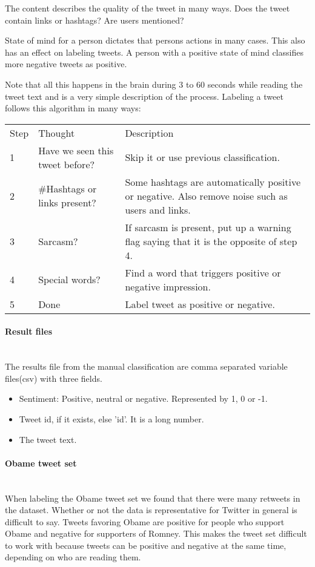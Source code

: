 The content describes the quality of the tweet in many ways. Does the tweet
contain links or hashtags? Are users mentioned?

State of mind for a person dictates that persons actions in many cases. This
also has an effect on labeling tweets. A person with a positive state of mind
classifies more negative tweets as positive.

Note that all this happens in the brain during 3 to 60 seconds while reading
the tweet text and is a very simple description of the process.
Labeling a tweet follows this algorithm in many ways:

\begin{tabular}{ l p{3cm} p{6cm} }
Step & Thought & Description \\
1 & Have we seen this tweet before? & Skip it or use previous classification. \\
2 & \#Hashtags or links present? & Some hashtags are automatically positive or
negative. Also remove noise such as users and links.\\
3 & Sarcasm? & If sarcasm is present, put up a warning flag saying that it is
the opposite of step 4.\\
4 & Special words? & Find a word that triggers positive or negative
impression.\\
5 & Done & Label tweet as positive or negative.\\
\end{tabular}

\paragraph{Result files}
\hspace{0pt}\\
The results file from the manual classification are comma separated variable
files(csv) with three fields.
\begin{itemize}
    \item Sentiment: Positive, neutral or negative. Represented by 1, 0 or -1.
    \item Tweet id, if it exists, else 'id'. It is a long number.
    \item The tweet text.
\end{itemize}

\paragraph{Obame tweet set}
\hspace{0pt}\\
When labeling the Obame tweet set we found that there were many retweets in the
dataset. Whether or not the data is representative for Twitter in general is
difficult to say. Tweets favoring Obame are positive for people who support
Obame and negative for supporters of Romney. This makes the
tweet set difficult to work with because tweets can be positive and negative at
the same time, depending on who are reading them. 

